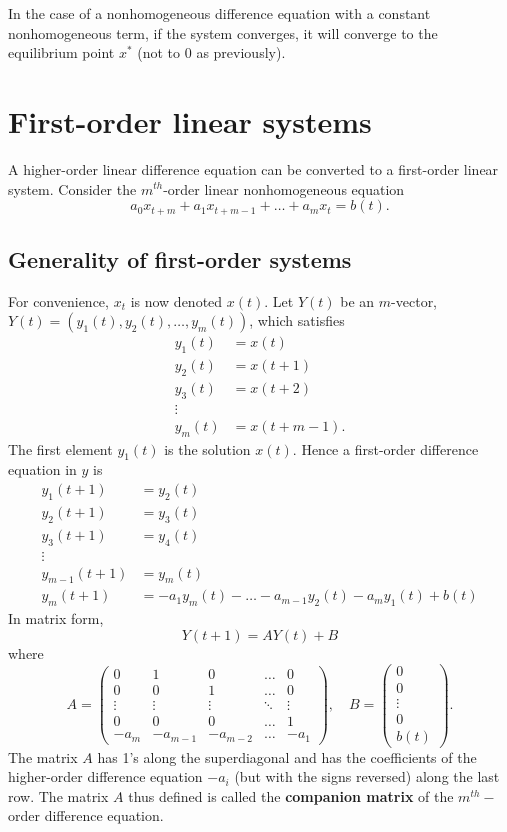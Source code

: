 In the case of a nonhomogeneous difference equation with a constant nonhomogeneous term, if the system converges, it will converge to the equilibrium point $x^*$ (not to $0$ as previously).



\section{First-order linear systems}
A higher-order linear difference equation can be converted to a first-order linear system.
Consider the $m^{th}$-order linear nonhomogeneous equation 
\[
a_0x_{t+m}+a_1x_{t+m-1}+\dots + a_m x_{t}=b(t).
\]
\subsection{Generality of first-order systems}
For convenience, $x_t$ is now denoted $x(t)$. Let $Y(t)$ be an $m$-vector, $Y(t)=(y_1(t),y_2(t),\dots, y_m(t))$, which satisfies
\begin{align*}
y_1(t)&=x(t)\\
y_2(t)&=x(t+1)\\
y_3(t)&=x(t+2)\\
\vdots& \\
y_{m}(t)&=x(t+m-1).
\end{align*}
The first element $y_1(t)$ is the solution $x(t)$. Hence a first-order difference equation in $y$ is 
\begin{align*}
y_1(t+1)&=y_2(t)\\
y_2(t+1)&=y_3(t)\\
y_3(t+1)&=y_4(t)\\
\vdots &\\
y_{m-1}(t+1)&=y_{m}(t)\\
y_{m}(t+1)&=-a_1 y_m(t)-\dots -a_{m-1}y_2(t)- a_m y_1(t)+b(t)
\end{align*}
In matrix form,
$$Y(t+1)=AY(t)+B$$
where
$$A=\left (
\begin{array}{ccccc}
0 & 1 & 0 & \hdots & 0\\
0 & 0 & 1 & \hdots & 0\\
\vdots & \vdots & \vdots & \ddots & \vdots\\
0 & 0 & 0 & \hdots & 1\\
-a_{m} & -a_{m-1} & -a_{m-2} & \hdots & -a_{1}
\end{array}
\right), \quad B=\left ( \begin{array}{c}
0\\
0\\
\vdots\\
0\\
b(t)
\end{array}
\right).
$$ 
The matrix $A$ has 1's along the superdiagonal and has the coefficients of the higher-order difference equation $-a_i$ (but with the signs reversed) along the last row. The matrix $A$ thus defined is called the \textbf{companion matrix} of the $m^{th}-$order difference equation.

